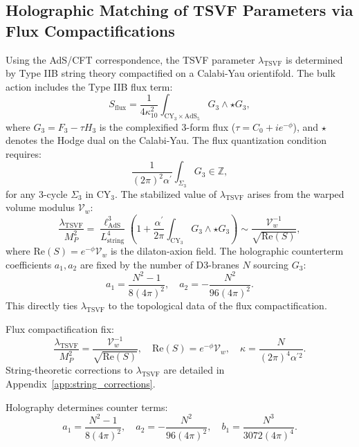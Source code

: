 \documentclass[12pt, onecolumn]{article}
\theoremstyle{definition}
\newcommand{\tsvf}{\lambda_{\mathrm{TSVF}}}
\numberwithin{equation}{section}
\begin{document}
\subsection{Holographic Matching of TSVF Parameters via Flux Compactifications}
\label{subsec:string}
Using the AdS/CFT correspondence, the TSVF parameter \(\tsvf\) is determined by Type IIB string theory compactified on a Calabi-Yau orientifold. The bulk action includes the Type IIB flux term:
\begin{equation}
S_{\text{flux}} = \frac{1}{4\kappa_{10}^2} \int_{\text{CY}_3 \times \text{AdS}_5} G_3 \wedge \star G_3,
\end{equation}
where \(G_3 = F_3 - \tau H_3\) is the complexified 3-form flux (\(\tau = C_0 + i e^{-\phi}\)), and \(\star\) denotes the Hodge dual on the Calabi-Yau. The flux quantization condition requires:
\begin{equation}
\frac{1}{(2\pi)^2 \alpha^{\prime}} \int_{\Sigma_3} G_3 \in \mathbb{Z},
\label{eq:flux_quant}
\end{equation}
for any 3-cycle \(\Sigma_3\) in \(\text{CY}_3\). The stabilized value of \(\tsvf\) arises from the warped volume modulus \(\mathcal{V}_w\):
\begin{equation}
\frac{\tsvf}{M_P^2} = \frac{\ell_{\text{AdS}}^3}{L_{\text{string}}^4} \left(1 + \frac{\alpha^{\prime}}{2\pi} \int_{\text{CY}_3} G_3 \wedge \star G_3 \right) \sim \frac{\mathcal{V}_w^{-1}}{\sqrt{\text{Re}(S)}},
\end{equation}
where \(\text{Re}(S) = e^{-\phi} \mathcal{V}_w\) is the dilaton-axion field. The holographic counterterm coefficients \(a_1, a_2\) are fixed by the number of D3-branes \(N\) sourcing \(G_3\):
\begin{equation}
a_1 = \frac{N^2 - 1}{8(4\pi)^2}, \quad a_2 = -\frac{N^2}{96(4\pi)^2}.
\end{equation}
This directly ties \(\tsvf\) to the topological data of the flux compactification.

Flux compactification fix:  
\begin{equation}
\frac{\tsvf}{M_P^2} = \frac{\mathcal{V}_w^{-1}}{\sqrt{\mathrm{Re}(S)}}, \quad \mathrm{Re}(S) = e^{-\phi}\mathcal{V}_w, \quad \kappa = \frac{N}{(2\pi)^4\alpha^{\prime 2}}.
\end{equation} 
String-theoretic corrections to \(\tsvf\) are detailed in Appendix~\ref{app:string_corrections}.

Holography determines counter terms:  
\begin{equation}
a_1 = \frac{N^2 - 1}{8(4\pi)^2}, \quad a_2 = -\frac{N^2}{96(4\pi)^2}, \quad b_1 = \frac{N^3}{3072(4\pi)^4}.
\end{equation}
\end{document}
